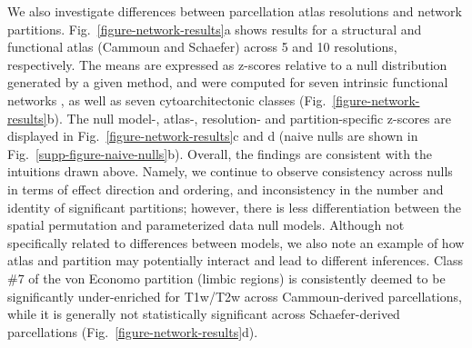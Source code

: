 \documentclass[12pt,aps,pra,reprint,showkeys]{revtex4-1}
\begin{document}
We also investigate differences between parcellation atlas resolutions and network partitions.
Fig.~\ref{figure-network-results}a shows results for a structural and functional atlas (Cammoun and Schaefer) across 5 and 10 resolutions, respectively.
The means are expressed as z-scores relative to a null distribution generated by a given method, and were computed for seven intrinsic functional networks \citep{yeo2011organization}, as well as seven cytoarchitectonic classes \citep{voneconomo1925cytoarchitecture, scholtens2018neuroimage} (Fig.~\ref{figure-network-results}b).
The null model-, atlas-, resolution- and partition-specific z-scores are displayed in Fig.~\ref{figure-network-results}c and d (naive nulls are shown in Fig.~\ref{supp-figure-naive-nulls}b).
Overall, the findings are consistent with the intuitions drawn above.
Namely, we continue to observe consistency across nulls in terms of effect direction and ordering, and inconsistency in the number and identity of significant partitions; however, there is less differentiation between the spatial permutation and parameterized data null models.
Although not specifically related to differences between models, we also note an example of how atlas and partition may potentially interact and lead to different inferences.
Class \#7 of the von Economo partition (limbic regions) is consistently deemed to be significantly under-enriched for T1w/T2w across Cammoun-derived parcellations, while it is generally not statistically significant across Schaefer-derived parcellations (Fig.~\ref{figure-network-results}d).
\end{document}
